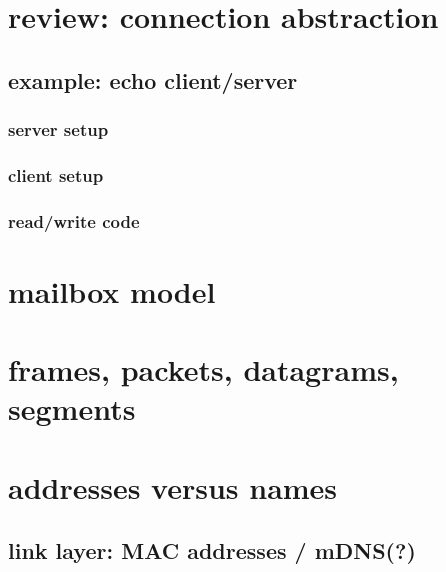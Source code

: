 \date{}
\title{}
\date{}

\begin{frame}
    \titlepage
\end{frame}



\section{review: connection abstraction}



\subsection{example: echo client/server}
\subsubsection{server setup}

\subsubsection{client setup}


\subsubsection{read/write code}


\section{mailbox model}


\section{frames, packets, datagrams, segments}



\section{addresses versus names}

\subsection{link layer: MAC addresses / mDNS(?)}

